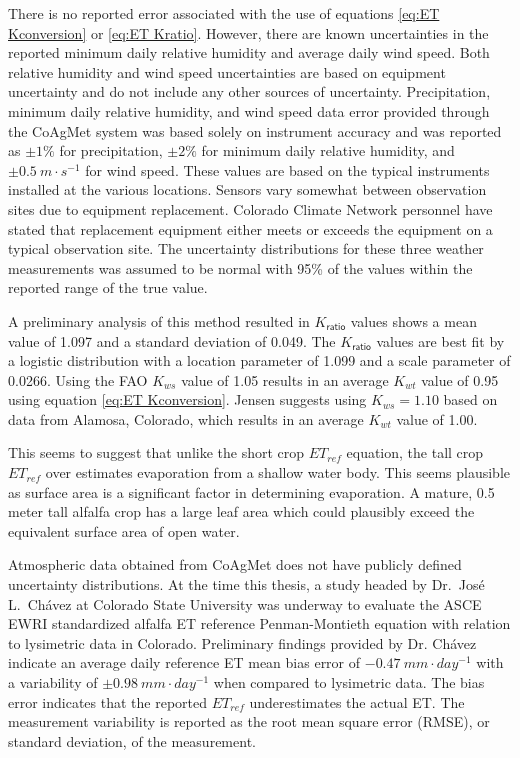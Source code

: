 \begin{linenumbers}
There is no reported error associated with the use of equations \ref{eq:ET Kconversion} or \ref{eq:ET Kratio}.  However, there are known uncertainties in the reported minimum daily relative humidity and average daily wind speed.  Both relative humidity and wind speed uncertainties are based on equipment uncertainty and do not include any other sources of uncertainty.  Precipitation, minimum daily relative humidity, and wind speed data error provided through the CoAgMet system was based solely on instrument accuracy and was reported as $\pm1\%$ for precipitation, $\pm2\%$ for minimum daily relative humidity, and $\pm0.5~m \cdot s^{-1}$ for wind speed.  These values are based on the typical instruments installed at the various locations.  Sensors vary somewhat between observation sites due to equipment replacement.  Colorado Climate Network personnel have stated that replacement equipment either meets or exceeds the equipment on a typical observation site.  The uncertainty distributions for these three weather measurements was assumed to be normal with 95\% of the values within the reported range of the true value.

A preliminary analysis of this method resulted in $K_\mathsf{ratio}$ values shows a mean value of 1.097 and a standard deviation of 0.049.  The $K_\mathsf{ratio}$ values are best fit by a logistic distribution with a location parameter of 1.099 and a scale parameter of 0.0266.  Using the FAO $K_{ws}$ value of 1.05 results in an average $K_{wt}$ value of 0.95 using equation \ref{eq:ET Kconversion}.  Jensen suggests using $K_{ws}=1.10$ based on data from Alamosa, Colorado, which results in an average $K_{wt}$ value of 1.00.

This seems to suggest that unlike the short crop $ET_{ref}$ equation, the tall crop $ET_{ref}$ over estimates evaporation from a shallow water body.  This seems plausible as surface area is a significant factor in determining evaporation.  A mature, 0.5 meter tall alfalfa crop has a large leaf area which could plausibly exceed the equivalent surface area of open water.  

Atmospheric data obtained from CoAgMet does not have publicly defined uncertainty distributions.  At the time this thesis, a study headed by Dr.\ Jos\'{e} L.\ Ch\'{a}vez at Colorado State University was underway to evaluate the ASCE EWRI standardized alfalfa ET reference Penman-Montieth equation with relation to lysimetric data in Colorado.  Preliminary findings provided by Dr. Ch\'{a}vez indicate an average daily reference ET mean bias error of $-0.47~mm \cdot day^{-1}$ with a variability of $\pm 0.98~mm \cdot day^{-1}$ when compared to lysimetric data.  The bias error indicates that the reported $ET_{ref}$ underestimates the actual ET.  The measurement variability is reported as the root mean square error (RMSE), or standard deviation, of the measurement.


\end{linenumbers}

